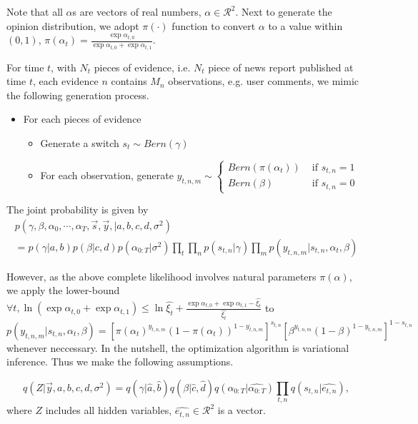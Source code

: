 \documentclass[11pt]{report}
\newcommand{\Real}{\mathcal{R}}
\begin{document}
Note that all $\alpha$s  are vectors of real numbers, $\alpha\in \Real^2$. Next to generate the opinion distribution, we adopt $\pi(\cdot)$ function to convert $\alpha$ to a value within $(0,1)$, $\pi(\alpha_t)=\frac{\exp \alpha_{t,0}}{\exp \alpha_{t,0} + \exp \alpha_{t,1}}$.

For time $t$, with $N_t$ pieces of evidence, i.e. $N_t$ piece of news report published at time $t$, each evidence $n$ contains $M_n$ observations, e.g. user comments, we mimic the following generation process. 
\begin{itemize}
\item For each pieces of evidence
\begin{itemize}
\item Generate a switch $s_t \sim Bern(\gamma)$
\item For each observation, generate $y_{t,n,m}\sim \begin{cases}
Bern(\pi(\alpha_t)) & \text{ if } s_{t,n}= 1\\ 
Bern(\beta) & \text{ if } s_{t,n}= 0 
\end{cases}$
\end{itemize}
\end{itemize}

The joint probability is given by
\begin{eqnarray*}
    p(\gamma,\beta,\alpha_0,\cdots,\alpha_T, \vec{s},\vec{y}, |a,b,c,d,\sigma^2) \\
    =    p(\gamma|a,b) p(\beta|c,d)  p(\alpha_{0:T}|\sigma^2) \prod_t \prod_ n p(s_{t,n}|\gamma) \prod_m p(y_{t,n,m}|s_{t,n},\alpha_t,\beta) 
    \end{eqnarray*}

However, as the above complete likelihood involves natural parameters $\pi(\alpha)$, we apply the lower-bound $\forall t, \ln (\exp \alpha_{t,0}+ \exp \alpha_{t,1}) \leq \ln \hat{\xi_t} + \frac{\exp \alpha_{t,0} + \exp \alpha_{t,1} -\hat{\xi_t}}{\hat{\xi_t}}$ to $p(y_{t,n,m}|s_{t,n},\alpha_t,\beta) = [\pi(\alpha_t)^{y_{t,n,m}} (1-\pi(\alpha_t))^{1-y_{t,n,m}}]^{s_{t,n}} [\beta^{y_{t,n,m}}(1-\beta)^{1-y_{t,n,m}}]^{1-s_{t,n}}$ whenever neccessary.
In the nutshell, the optimization algorithm is variational inference. Thus we make the following assumptions. 

\begin{equation*}
q(Z|\vec{y},a,b,c,d,\sigma^2) = q(\gamma|\hat{a},\hat{b}) q(\beta|\hat{c},\hat{d}) q(\alpha_{0:T}|\hat{\alpha_{0:T}})\prod_{t,n} q(s_{t,n}|\hat{e_{t,n}}) , 
\end{equation*}
where $Z$ includes all hidden variables, $\hat{e_{t,n}}\in \Real^2 $ is a vector.  
\end{document}
